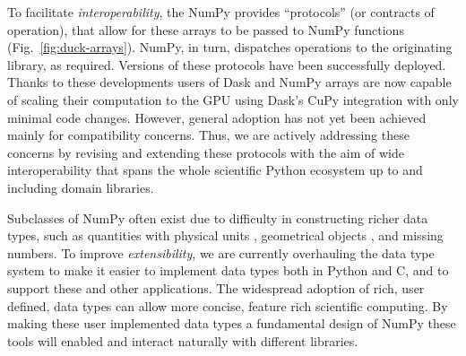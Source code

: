 To facilitate \emph{interoperability}, the NumPy provides
``protocols'' (or contracts of operation), that allow for these arrays to be
passed to NumPy functions (Fig.~\ref{fig:duck-arrays}).
NumPy, in turn, dispatches operations to the originating library, as required.
Versions of these protocols have been successfully deployed.
Thanks to these developments users of Dask and NumPy arrays are now capable
of scaling their computation to the GPU using Dask's CuPy integration with
only minimal code changes.
However, general adoption has not yet been achieved mainly for compatibility
concerns.
Thus, we are actively addressing these concerns by revising and extending
these protocols with the aim of wide interoperability that spans the whole
scientific Python ecosystem up to and including domain libraries.


Subclasses of NumPy often exist due to difficulty in constructing richer data
types, such as quantities with physical units \cite{astropy,Goldbaum2018,pint},
geometrical objects \cite{pygeos}, and missing numbers. %
To improve \emph{extensibility}, we are currently overhauling the data type
system to make it easier to implement data types both in Python and C, and to
support these and other applications.
The widespread adoption of rich, user defined, data types can allow more
concise, feature rich scientific computing.
By making these user implemented data types a fundamental design of NumPy
these tools will enabled and interact naturally with different libraries.
%

